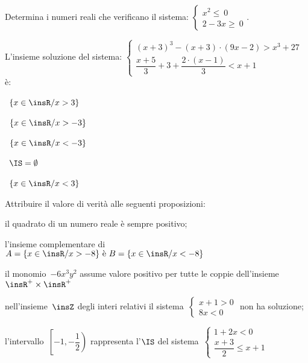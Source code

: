 \begin{esercizio}[\Ast]
 \label{ese:21.34}
 Determina i numeri reali che verificano il sistema:
 \(\left\{%
  \begin{array}{l}
  x^{2}\le~0
  \\2-3x\ge~0
 \end{array}\right..\)
 \end{esercizio}

\begin{esercizio}
 \label{ese:21.35}
 L'insieme soluzione del sistema:
\(\left\{\begin{array}{l}
  (x+3)^{3}-(x+3)\cdot (9x-2)>x^{3}+27\\
  \dfrac{x+5}{3}+3+\dfrac{2\cdot (x-1)}{3}<x+1
 \end{array}\right.\) è:
\begin{multicols}{2}
\boxA\quad~\(\left\{x\in \insR/x>3\right\}\)

\boxB\quad~\(\left\{x\in \insR/x>-3\right\}\)

\boxC\quad~\(\left\{x\in \insR/x<-3\right\}\)

\boxD\quad~\(\IS=\emptyset \)

\boxE\quad~\(\left\{x\in\insR/x<3\right\}\)
\end{multicols}

\end{esercizio}

\begin{esercizio}
 \label{ese:21.36}
 Attribuire il valore di verità alle seguenti proposizioni:

\begin{enumeratea}
\item il quadrato di un numero reale è sempre positivo;
\item l'insieme complementare di~\(A=\{x\in\insR/x>-8\}\text{ è }B=\{x\in\insR/x<-8\}\)
\item il monomio~\(-6x^{3}y^{2}\) assume valore positivo per tutte le coppie dell'insieme~\(\insR^{+}\times\insR^{+}\)
\item nell'insieme~\(\insZ\) degli interi relativi il sistema~\(\left\{\begin{array}{l}x+1>0\\8x<0\end{array}\right.\) non ha soluzione;
\item l'intervallo~\(\left[-1,\left.-{\dfrac{1}{2}}\right)\right.\) rappresenta l'\(\IS\) del sistema~\(\left\{\begin{array}{l}1+2x<0 \\\dfrac{x+3}{2}\le x+1\end{array}\right.\)
\end{enumeratea}
\end{esercizio}

